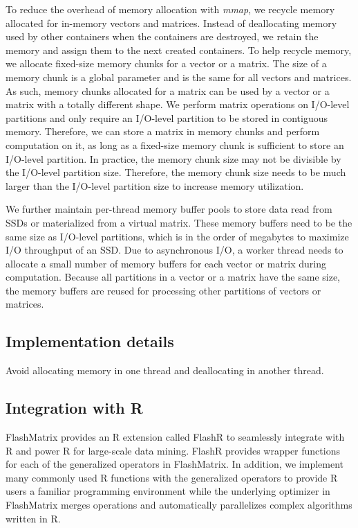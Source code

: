 To reduce the overhead of memory allocation with \textit{mmap}, we recycle
memory allocated for in-memory vectors and matrices. Instead of deallocating
memory used
by other containers when the containers are destroyed, we retain the memory
and assign them to the next created containers. To help recycle memory, we
allocate fixed-size memory chunks for a vector or a matrix. The size of
a memory chunk is a global parameter and is the same for all vectors and
matrices. As such, memory chunks allocated for a matrix can be used by a vector
or a matrix with a totally different shape. We perform matrix operations on
I/O-level partitions and only require an I/O-level partition to be stored in
contiguous memory. Therefore, we can store a matrix in memory chunks and
perform computation on it, as long as a fixed-size memory chunk is sufficient
to store an I/O-level partition. In practice, the memory chunk size may
not be divisible by the I/O-level partition size. Therefore, the memory chunk
size needs to be much larger than the I/O-level partition size to increase
memory utilization.

We further maintain per-thread memory buffer pools to store data read from
SSDs or materialized from a virtual matrix. These memory buffers need to be
the same size as I/O-level partitions, which is in the order of megabytes
to maximize I/O throughput of an SSD. Due to asynchronous I/O, a worker thread
needs to allocate a small number of memory buffers for each vector or matrix
during computation. Because all partitions in a vector or a matrix have
the same size, the memory buffers are reused for processing other partitions
of vectors or matrices.

\subsection{Implementation details}

Avoid allocating memory in one thread and deallocating in another thread.

\subsection{Integration with R}

FlashMatrix provides an R extension called FlashR to seamlessly integrate with
R and power R for large-scale data mining. FlashR provides wrapper functions
for each of the generalized operators
in FlashMatrix. In addition, we implement many commonly used R functions with
the generalized operators to provide R users a familiar programming environment
while the underlying optimizer in FlashMatrix merges operations and
automatically parallelizes complex algorithms written in R.

